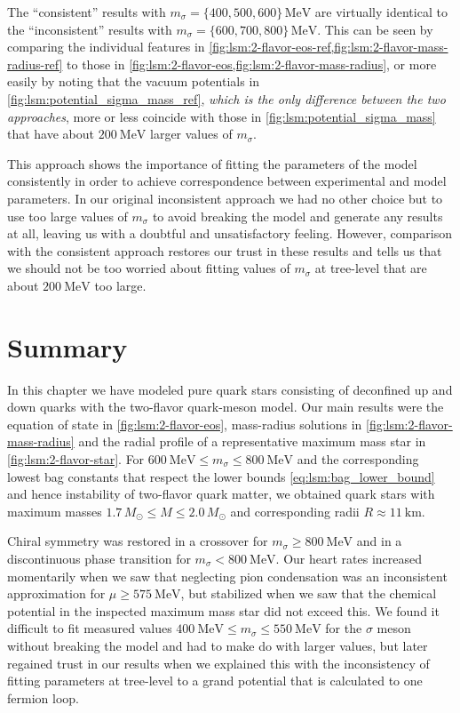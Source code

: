 The ``consistent'' results with $m_\sigma=\{400,500,600\} \, \si{\mega\electronvolt}$ are
virtually identical to the ``inconsistent'' results with $m_\sigma=\{600,700,800\} \, \si{\mega\electronvolt}$.
This can be seen by comparing the individual features in \cref{fig:lsm:2-flavor-eos-ref,fig:lsm:2-flavor-mass-radius-ref}
to those in \cref{fig:lsm:2-flavor-eos,fig:lsm:2-flavor-mass-radius},
or more easily by noting that the vacuum potentials in \cref{fig:lsm:potential_sigma_mass_ref},
\emph{which is the only difference between the two approaches},
more or less coincide with those in \cref{fig:lsm:potential_sigma_mass} that have about $\SI{200}{\mega\electronvolt}$ larger values of $m_\sigma$.

This approach shows the importance of fitting the parameters of the model consistently
in order to achieve correspondence between experimental and model parameters.
In our original inconsistent approach we had no other choice but to use too large values of $m_\sigma$ to avoid breaking the model and generate any results at all,
leaving us with a doubtful and unsatisfactory feeling.
However, comparison with the consistent approach restores our trust in these results
and tells us that we should not be too worried about 
fitting values of $m_\sigma$ at tree-level that are about $\SI{200}{\mega\electronvolt}$ too large.

\section{Summary}

In this chapter we have modeled pure quark stars consisting of deconfined up and down quarks with the two-flavor quark-meson model.
Our main results were the equation of state in \cref{fig:lsm:2-flavor-eos}, mass-radius solutions in \cref{fig:lsm:2-flavor-mass-radius} and the radial profile of a representative maximum mass star in \cref{fig:lsm:2-flavor-star}.
For $\SI{600}{\mega\electronvolt} \leq m_\sigma \leq \SI{800}{\mega\electronvolt}$ and the corresponding lowest bag constants that respect the lower bounds \eqref{eq:lsm:bag_lower_bound} and hence instability of two-flavor quark matter,
we obtained quark stars with maximum masses $1.7 \, M_\odot \leq M \leq 2.0 \, M_\odot$ and corresponding radii $R \approx \SI{11}{\kilo\meter}$.

Chiral symmetry was restored in a crossover for $m_\sigma \geq \SI{800}{\mega\electronvolt}$
and in a discontinuous phase transition for $m_\sigma < \SI{800}{\mega\electronvolt}$.
Our heart rates increased momentarily when we saw that neglecting pion condensation was an inconsistent approximation for $\mu \geq \SI{575}{\mega\electronvolt}$,
but stabilized when we saw that the chemical potential in the inspected maximum mass star did not exceed this.
We found it difficult to fit measured values $\SI{400}{\mega\electronvolt} \leq m_\sigma \leq \SI{550}{\mega\electronvolt}$ for the $\sigma$ meson without breaking the model and had to make do with larger values,
but later regained trust in our results when we explained this with the inconsistency of fitting parameters at tree-level to a grand potential that is calculated to one fermion loop.

